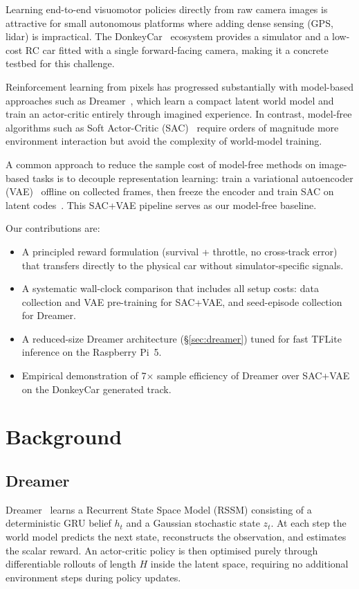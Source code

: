 \documentclass[10pt,twocolumn]{article}
\begin{document}
Learning end-to-end visuomotor policies directly from raw camera images
is attractive for small autonomous platforms where adding dense sensing
(GPS, lidar) is impractical.
The DonkeyCar~\cite{donkeycar} ecosystem provides a simulator and a low-cost
RC car fitted with a single forward-facing camera, making it a concrete
testbed for this challenge.

Reinforcement learning from pixels has progressed substantially with
model-based approaches such as Dreamer~\cite{hafner2019dream,hafner2020dreamerv2,hafner2023dreamerv3},
which learn a compact latent world model and train an actor-critic
entirely through imagined experience.
In contrast, model-free algorithms such as
Soft Actor-Critic (SAC)~\cite{haarnoja2018sac} require orders of magnitude more
environment interaction but avoid the complexity of world-model training.

A common approach to reduce the sample cost of model-free methods on
image-based tasks is to decouple representation learning: train a
variational autoencoder (VAE)~\cite{kingma2014vae} offline on collected frames,
then freeze the encoder and train SAC on latent codes~\cite{ha2018worldmodels}.
This SAC+VAE pipeline serves as our model-free baseline.

Our contributions are:
\begin{itemize}[leftmargin=1.2em, itemsep=1pt, topsep=2pt]
  \item A principled reward formulation (survival + throttle, no cross-track error)
        that transfers directly to the physical car without simulator-specific signals.
  \item A systematic wall-clock comparison that includes all setup costs:
        data collection and VAE pre-training for SAC+VAE,
        and seed-episode collection for Dreamer.
  \item A reduced-size Dreamer architecture (\S\ref{sec:dreamer}) tuned for
        fast TFLite inference on the Raspberry Pi~5.
  \item Empirical demonstration of 7$\times$ sample efficiency of Dreamer
        over SAC+VAE on the DonkeyCar generated track.
\end{itemize}

\section{Background}

\subsection{Dreamer}
Dreamer~\cite{hafner2019dream} learns a Recurrent State Space Model (RSSM)
consisting of a deterministic GRU belief $h_t$ and a Gaussian stochastic state
$z_t$. At each step the world model predicts the next state, reconstructs the
observation, and estimates the scalar reward. An actor-critic policy is then
optimised purely through differentiable rollouts of length $H$ inside the latent
space, requiring no additional environment steps during policy updates.
\end{document}
